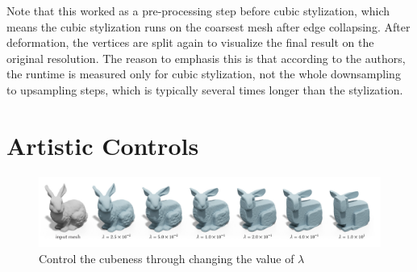 \documentclass[a4paper,10pt]{article}
\begin{document}
Note that this worked as a pre-processing step before cubic stylization, which means the cubic stylization runs on the coarsest mesh after edge collapsing. After deformation, the vertices are split again to visualize the final result on the original resolution. The reason to emphasis this is that according to the authors, the runtime is measured only for cubic stylization, not the whole downsampling to upsampling steps, which is typically several times longer than the stylization.

\section{Artistic Controls}\label{artistic}
	\begin{figure}[hbt!]
		\includegraphics[width=\linewidth]{figures/lambda1}
		\caption{Control the cubeness through changing the value of $\lambda$}
		\label{fig:lbd1}
	\end{figure}
\end{document}
